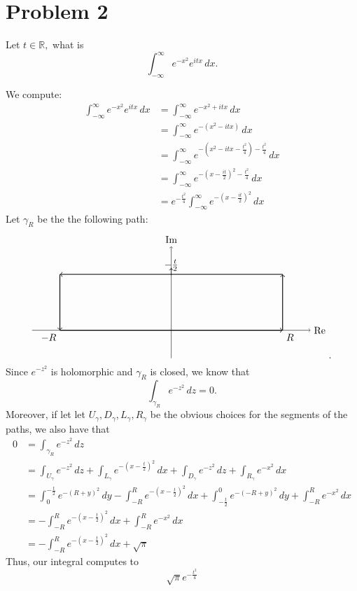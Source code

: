 \documentclass[11pt]{article}
\newcommand{\bbR}{\mathbb{R}}
\begin{document}
\section*{Problem 2}
Let $t\in \bbR,$ what is 
\[\int_{-\infty}^\infty e^{-x^2}e^{itx}\,dx.\]
\begin{solution}
    We compute:
    \begin{align*}
\int_{-\infty}^\infty e^{-x^2}e^{itx}\,dx &= \int_{-\infty}^\infty e^{-x^2 + itx}\,dx   \\
&= \int_{-\infty}^\infty e^{-(x^2 - itx)}\,dx\\
&= \int_{-\infty}^\infty e^{-(x^2- itx - \frac{t^2}{4}) - \frac{t^2}{4}}\,dx\\
&= \int_{-\infty}^\infty e^{-(x - \frac{it}{2})^2 - \frac{t^2}{4}}\,dx\\
&= e^{-\frac{t^2}{4}}\int_{-\infty}^\infty e^{-(x - \frac{it}{2})^2}\,dx
    \end{align*}
Let $\gamma_R$ be the the following path: 
\[\begin{tikzpicture}
    \coordinate (A) at (-4, 0);
    \coordinate (B) at (4, 0);
    \coordinate (C) at (4, 2);
    \coordinate (D) at (-4, 2);
    \coordinate (M) at (0, 2);

    \draw[->] (-5, 0) -- (5, 0) node[right] {Re};
    \draw[->] (0, -1) -- (0, 3) node[above] {Im};

    \draw[->, thick] (A) -- (B) node[below right] {$R$};
    \draw[->, thick] (B) -- (C);
    \draw[->, thick] (C) -- (D);
    \draw[->, thick] (D) -- (A) node[below left] {$-R$};


    \node[above] at (0, 2) {$-\frac{t}{2}$};

    \node at (-3, 0.1) {};
    \node at (3, 0.1) {};
    \node at (0, 2.1) {\small $\uparrow$};
    \node at (4.1, 1) {};
    \node at (-4.1, 1) {};


\end{tikzpicture}.\]
Since $e^{-z^2}$ is holomorphic and $\gamma_R$ is closed, we know that 
\[\int_{\gamma_R}e^{-z^2}\,dz = 0.\] Moreover, if let let $U_\gamma, D_\gamma, L_\gamma, R_\gamma$ be the obvious choices for the segments of the paths, we also have that 
\begin{align*}
    0 &= \int_{\gamma_R}e^{-z^2}\,dz\\ 
    &= \int_{U_\gamma}e^{-z^2}\,dz  + \int_{L_\gamma}e^{-(x-\frac{t}{2})^2}\,dx + \int_{D_\gamma}e^{-z^2}\,dz + \int_{R_\gamma}e^{-x^2}\,dx\\
    &= \int_{0}^{-\frac{t}{2}}e^{-(R + y)^2}\,dy  - \int_{-R}^Re^{-(x-\frac{t}{2})^2}\,dx + \int_{-\frac{t}{2}}^0e^{-(-R + y)^2}\,dy + \int_{-R}^Re^{-x^2}\,dx \\
    &= -\int_{-R}^Re^{-(x-\frac{t}{2})^2}\,dx  + \int_{-R}^Re^{-x^2}\,dx\\
    &= -\int_{-R}^Re^{-(x-\frac{t}{2})^2}\,dx +\sqrt{\pi}
\end{align*}
Thus, our integral computes to 
\[\boxed{\sqrt{\pi}e^{-\frac{t^2}{4}}}\]
\end{solution}
\end{document}
